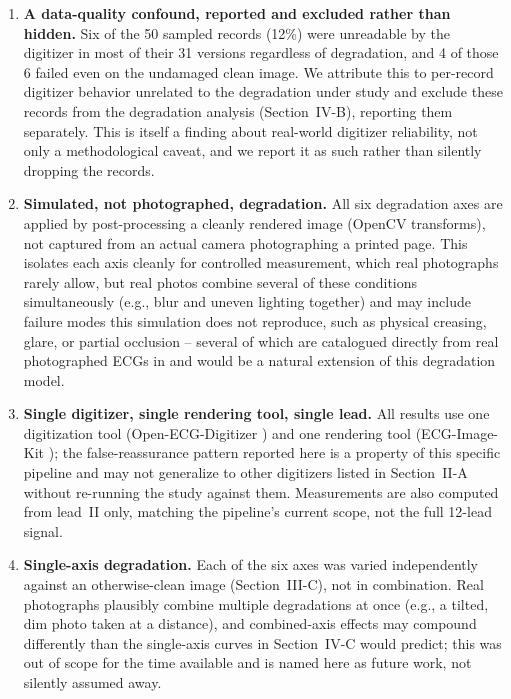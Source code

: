 \documentclass[conference]{IEEEtran}
\begin{document}
\begin{enumerate}
(Section~III-A). Of those 50, only 9 records have a truly abnormal ground-truth heart
rate, since a false-reassurance event can only be observed on an abnormal-truth
record. The false-reassurance counts in Section~IV-D (2/9, 4/9) should be read as a
pattern demonstrating \emph{that} the failure exists and roughly \emph{where} it
concentrates, not as a precise population rate; Wilson 95\% confidence intervals
computed over this sample are wide, consistent with $n=9$.
\item \textbf{A data-quality confound, reported and excluded rather than hidden.} Six
of the 50 sampled records (12\%) were unreadable by the digitizer in most of their 31
versions regardless of degradation, and 4 of those 6 failed even on the undamaged
clean image. We attribute this to per-record digitizer behavior unrelated to the
degradation under study and exclude these records from the degradation analysis
(Section~IV-B), reporting them separately. This is itself a finding about real-world
digitizer reliability, not only a methodological caveat, and we report it as such
rather than silently dropping the records.
\item \textbf{Simulated, not photographed, degradation.} All six degradation axes are
applied by post-processing a cleanly rendered image (OpenCV transforms), not
captured from an actual camera photographing a printed page. This isolates each axis
cleanly for controlled measurement, which real photographs rarely allow, but real
photos combine several of these conditions simultaneously (e.g., blur and uneven
lighting together) and may include failure modes this simulation does not reproduce,
such as physical creasing, glare, or partial occlusion -- several of which are
catalogued directly from real photographed ECGs in \cite{ref2,ref4} and would be a
natural extension of this degradation model.
\item \textbf{Single digitizer, single rendering tool, single lead.} All results use
one digitization tool (Open-ECG-Digitizer \cite{ref5}) and one rendering tool
(ECG-Image-Kit \cite{ref1}); the false-reassurance pattern reported here is a property
of this specific pipeline and may not generalize to other digitizers listed in
Section~II-A \cite{ref2,ref3,ref4,ref6,ref7,ref8,ref9,ref10,ref11} without re-running
the study against them. Measurements are also computed from lead~II only, matching
the pipeline's current scope, not the full 12-lead signal.
\item \textbf{Single-axis degradation.} Each of the six axes was varied independently
against an otherwise-clean image (Section~III-C), not in combination. Real
photographs plausibly combine multiple degradations at once (e.g., a tilted, dim
photo taken at a distance), and combined-axis effects may compound differently than
the single-axis curves in Section~IV-C would predict; this was out of scope for the
time available and is named here as future work, not silently assumed away.
\end{enumerate}
\end{document}
